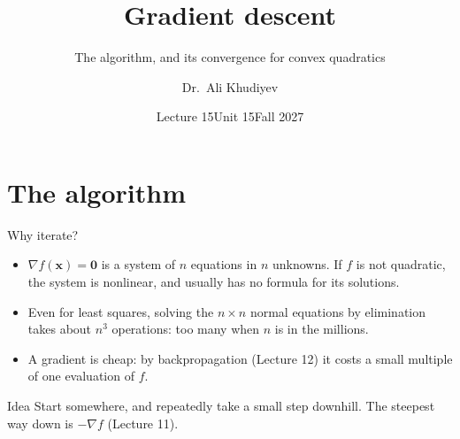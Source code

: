 \documentclass[10pt]{wosm-slides}
\title[L15 \textperiodcentered\ Gradient descent]{Gradient descent}
\subtitle{The algorithm, and its convergence for convex quadratics}
\author{Dr.\ Ali Khudiyev}
\institute{WoSM Academy}
\date{Lecture 15\enspace\textperiodcentered\enspace Unit 15\enspace\textperiodcentered\enspace Fall 2027}
\newcommand{\vx}{\mathbf{x}}
\begin{document}
\maketitle



\section{The algorithm}

\begin{frame}{Why iterate?}
  \begin{itemize}
    \item $\nabla f(\vx) = \mathbf 0$ is a system of $n$ equations in $n$ unknowns. If $f$ is not
      quadratic, the system is nonlinear, and usually has no formula for its solutions.
    \item Even for least squares, solving the $n \times n$ normal equations by elimination takes
      about $n^3$ operations: too many when $n$ is in the millions.
    \item A gradient is cheap: by backpropagation (Lecture 12) it costs a small multiple of one
      evaluation of $f$.
  \end{itemize}
  \pause
  \begin{block}{Idea}
    Start somewhere, and repeatedly take a small step downhill. The steepest way down is
    $-\nabla f$ (Lecture 11).
  \end{block}
\end{frame}
\end{document}
